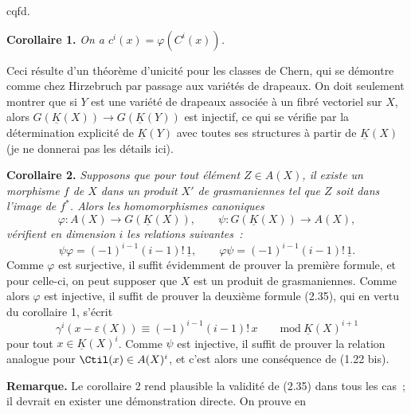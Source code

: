 \begin{flushright}cqfd.\end{flushright}

\textbf{Corollaire 1.} \emph{On a $c^i(x)=\varphi(C^i(x))$.}

Ceci résulte d'un théorème d'unicité pour les classes de Chern, qui se démontre comme chez Hirzebruch par passage aux variétés de drapeaux. On doit seulement montrer que si $Y$ est une variété de drapeaux associée à un fibré vectoriel sur $X$, alors $G(\underline K(X))\longrightarrow G(\underline K(Y))$ est injectif, ce qui se vérifie par la détermination explicité de $\underline K(Y)$ avec toutes ses structures à partir de $\underline K(X)$ (je ne donnerai pas les détails ici).

\textbf{Corollaire 2.} \emph{Supposons que pour tout élément $Z\in A(X)$, il existe un morphisme $f$ de $X$ dans un produit $X'$ de grasmaniennes tel que $Z$ soit dans l'image de $f^*$. Alors les homomorphismes canoniques}
\[
 \varphi:A(X)\longrightarrow G(\underline K(X)),\qquad \psi:G(\underline K(X))\longrightarrow A(X),
\]
\emph{vérifient en dimension $i$ les relations suivantes~:}
\begin{equation}\tag{2.35}
 \psi\varphi=(-1)^{i-1}(i-1)!\,\underline 1,\qquad
 \varphi\psi=(-1)^{i-1}(i-1)!\,\underline 1.
\end{equation}
Comme $\varphi$ est surjective, il suffit évidemment de prouver la première formule, et pour celle-ci, on peut supposer que $X$ est un produit de grasmaniennes. Comme alors $\varphi$ est injective, il suffit de prouver la deuxième formule (2.35), qui en vertu du corollaire 1, s'écrit
\[
 \gamma^i(x-\varepsilon(X))\equiv(-1)^{i-1}(i-1)!\,x\qquad\mathrm{mod}\ \underline K(X)^{i+1}
\]
pour tout $x\in\underline K(X)^i$. Comme $\psi$ est injective, il suffit de prouver la relation analogue pour $\Ctil(x)\in A(X)^i$, et c'est alors une conséquence de (1.22 bis).

\textbf{Remarque.} Le corollaire 2 rend plausible la validité de (2.35) dans tous les cas~; il devrait en exister une démonstration directe. On prouve en
